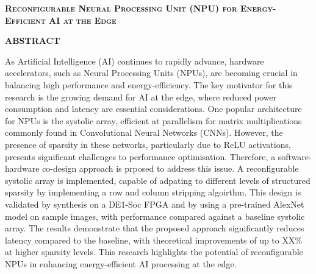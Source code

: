 \documentclass[12pt, a4paper, ukenglish]{article}
\begin{document}
\clearpage

\noindent \reportNumber

\vspace{1em}
\begin{center}
    {\large \textbf{\scshape Reconfigurable Neural Processing Unit (NPU) for Energy-Efficient AI at the Edge}}
\end{center}

\vspace{2em}
\begin{center}
    {\large \textbf{\name}}
\end{center}

\vspace{2em}
\begin{center}
    {\large \textbf{\scshape ABSTRACT}}
\end{center}



As Artificial Intelligence (AI) continues to rapidly advance, hardware accelerators, such as Neural Processing Units (NPUs), are becoming crucial in balancing high performance and energy-efficiency. The key motivator for this research is the growing demand for AI at the edge, where reduced power consumption and latency are essential considerations. One popular architecture for NPUs is the systolic array, efficient at parallelism for matrix multiplications commonly found in Convolutional Neural Networks (CNNs). However, the presence of sparsity in these networks, particularly due to ReLU activations, presents significant challenges to performance optimisation. Therefore, a software-hardware co-design approach is prposed to address this issue. A reconfigurable systolic array is implemented, capable of adpating to different levels of structured sparsity by implementing a row and column stripping algoirthm. This design is validated by synthesis on a DE1-Soc FPGA and by using a pre-trained AlexNet model on sample images, with performance compared against a baseline systolic array. The results demonstrate that the proposed approach significantly reduces latency compared to the baseline, with theoretical improvements of up to XX\% at higher sparsity levels. This research highlights the potential of reconfigurable NPUs in enhancing energy-efficient AI processing at the edge.
\end{document}
